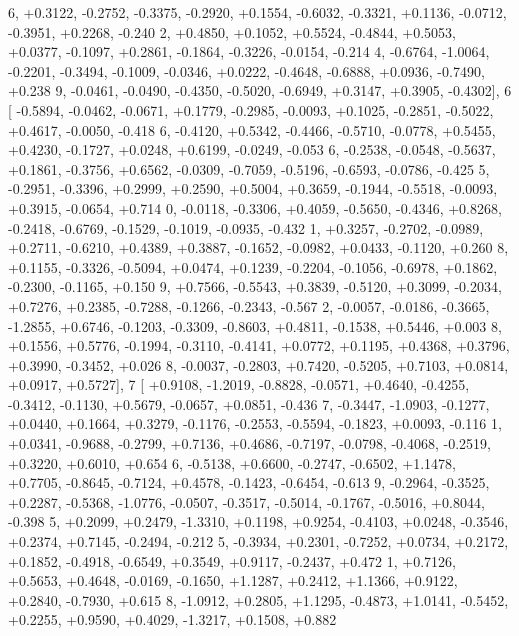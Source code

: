 \begin{DoxyCode}
      6, +0.3122, -0.2752, -0.3375, -0.2920, +0.1554, -0.6032, -0.3321, +0.1136, -0.0712, -0.3951, +0.2268, -0.240
      2, +0.4850, +0.1052, +0.5524, -0.4844, +0.5053, +0.0377, -0.1097, +0.2861, -0.1864, -0.3226, -0.0154, -0.214
      4, -0.6764, -1.0064, -0.2201, -0.3494, -0.1009, -0.0346, +0.0222, -0.4648, -0.6888, +0.0936, -0.7490, +0.238
      9, -0.0461, -0.0490, -0.4350, -0.5020, -0.6949, +0.3147, +0.3905, -0.4302],
6 [ -0.5894, -0.0462, -0.0671, +0.1779, -0.2985, -0.0093, +0.1025, -0.2851, -0.5022, +0.4617, -0.0050, -0.418
      6, -0.4120, +0.5342, -0.4466, -0.5710, -0.0778, +0.5455, +0.4230, -0.1727, +0.0248, +0.6199, -0.0249, -0.053
      6, -0.2538, -0.0548, -0.5637, +0.1861, -0.3756, +0.6562, -0.0309, -0.7059, -0.5196, -0.6593, -0.0786, -0.425
      5, -0.2951, -0.3396, +0.2999, +0.2590, +0.5004, +0.3659, -0.1944, -0.5518, -0.0093, +0.3915, -0.0654, +0.714
      0, -0.0118, -0.3306, +0.4059, -0.5650, -0.4346, +0.8268, -0.2418, -0.6769, -0.1529, -0.1019, -0.0935, -0.432
      1, +0.3257, -0.2702, -0.0989, +0.2711, -0.6210, +0.4389, +0.3887, -0.1652, -0.0982, +0.0433, -0.1120, +0.260
      8, +0.1155, -0.3326, -0.5094, +0.0474, +0.1239, -0.2204, -0.1056, -0.6978, +0.1862, -0.2300, -0.1165, +0.150
      9, +0.7566, -0.5543, +0.3839, -0.5120, +0.3099, -0.2034, +0.7276, +0.2385, -0.7288, -0.1266, -0.2343, -0.567
      2, -0.0057, -0.0186, -0.3665, -1.2855, +0.6746, -0.1203, -0.3309, -0.8603, +0.4811, -0.1538, +0.5446, +0.003
      8, +0.1556, +0.5776, -0.1994, -0.3110, -0.4141, +0.0772, +0.1195, +0.4368, +0.3796, +0.3990, -0.3452, +0.026
      8, -0.0037, -0.2803, +0.7420, -0.5205, +0.7103, +0.0814, +0.0917, +0.5727],
7 [ +0.9108, -1.2019, -0.8828, -0.0571, +0.4640, -0.4255, -0.3412, -0.1130, +0.5679, -0.0657, +0.0851, -0.436
      7, -0.3447, -1.0903, -0.1277, +0.0440, +0.1664, +0.3279, -0.1176, -0.2553, -0.5594, -0.1823, +0.0093, -0.116
      1, +0.0341, -0.9688, -0.2799, +0.7136, +0.4686, -0.7197, -0.0798, -0.4068, -0.2519, +0.3220, +0.6010, +0.654
      6, -0.5138, +0.6600, -0.2747, -0.6502, +1.1478, +0.7705, -0.8645, -0.7124, +0.4578, -0.1423, -0.6454, -0.613
      9, -0.2964, -0.3525, +0.2287, -0.5368, -1.0776, -0.0507, -0.3517, -0.5014, -0.1767, -0.5016, +0.8044, -0.398
      5, +0.2099, +0.2479, -1.3310, +0.1198, +0.9254, -0.4103, +0.0248, -0.3546, +0.2374, +0.7145, -0.2494, -0.212
      5, -0.3934, +0.2301, -0.7252, +0.0734, +0.2172, +0.1852, -0.4918, -0.6549, +0.3549, +0.9117, -0.2437, +0.472
      1, +0.7126, +0.5653, +0.4648, -0.0169, -0.1650, +1.1287, +0.2412, +1.1366, +0.9122, +0.2840, -0.7930, +0.615
      8, -1.0912, +0.2805, +1.1295, -0.4873, +1.0141, -0.5452, +0.2255, +0.9590, +0.4029, -1.3217, +0.1508, +0.882

\end{DoxyCode}
